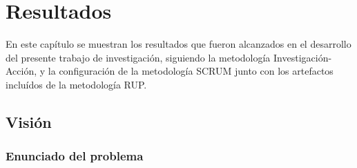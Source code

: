 \chapter{Resultados}

En este cap\'{i}tulo se muestran los resultados que fueron alcanzados en el desarrollo del presente trabajo de investigaci\'{o}n, siguiendo la metodolog\'{i}a Investigaci\'{o}n-Acci\'{o}n, y la configuraci\'{o}n de la metodolog\'{i}a SCRUM junto con los artefactos inclu\'{i}dos de la metodolog\'{i}a RUP.

\section{Visi\'{o}n}
	
	\subsection{Enunciado del problema}
	
	
